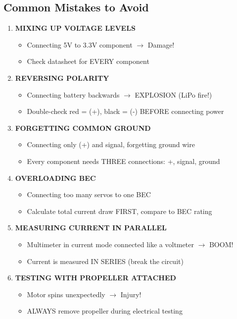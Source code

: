 \documentclass[11pt,letterpaper]{article}
\begin{document}
\subsection{Common Mistakes to Avoid}

\begin{enumerate}
\item \textbf{MIXING UP VOLTAGE LEVELS}
\begin{itemize}[nosep]
\item Connecting 5V to 3.3V component $\rightarrow$ Damage!
\item Check datasheet for EVERY component
\end{itemize}

\item \textbf{REVERSING POLARITY}
\begin{itemize}[nosep]
\item Connecting battery backwards $\rightarrow$ EXPLOSION (LiPo fire!)
\item Double-check red = (+), black = (-) BEFORE connecting power
\end{itemize}

\item \textbf{FORGETTING COMMON GROUND}
\begin{itemize}[nosep]
\item Connecting only (+) and signal, forgetting ground wire
\item Every component needs THREE connections: +, signal, ground
\end{itemize}

\item \textbf{OVERLOADING BEC}
\begin{itemize}[nosep]
\item Connecting too many servos to one BEC
\item Calculate total current draw FIRST, compare to BEC rating
\end{itemize}

\item \textbf{MEASURING CURRENT IN PARALLEL}
\begin{itemize}[nosep]
\item Multimeter in current mode connected like a voltmeter $\rightarrow$ BOOM!
\item Current is measured IN SERIES (break the circuit)
\end{itemize}

\item \textbf{TESTING WITH PROPELLER ATTACHED}
\begin{itemize}[nosep]
\item Motor spins unexpectedly $\rightarrow$ Injury!
\item ALWAYS remove propeller during electrical testing
\end{itemize}
\end{enumerate}
\end{document}
